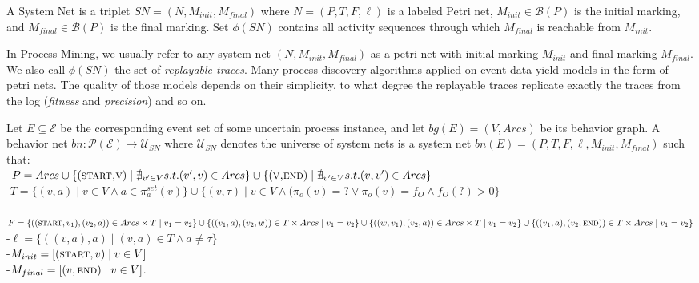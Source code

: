 \begin{definition}
A System Net is a triplet $SN=(N,M_{init},M_{final})$ where $N=(P,T,F,\ell)$ is a labeled Petri net, $M_{init} \in \mathcal{B}(P)$ is the initial marking, and $M_{final} \in \mathcal{B}(P)$ is the final marking.
Set $\phi(SN)$ contains all activity sequences through which $M_{final}$  is reachable from $M_{init}$.
\end{definition}

In Process Mining, we usually refer to any system net $(N,M_{init},M_{final})$ as a petri net with initial marking $M_{init}$ and final marking $M_{final}$.
We also call $\phi(SN)$ the set of \textit{replayable traces}.
Many process discovery algorithms applied on event data yield models in the form of petri nets.
The quality of those models depends on their simplicity, to what degree the replayable traces replicate exactly the traces from the log (\textit{fitness} and \textit{precision}) and so on.

\begin{definition} \label{def: bn}
Let $E \subseteq \mathcal{E}$ be the corresponding event set of some uncertain process instance, and let $bg(E)=(V,Arcs)$ be its behavior graph.
A behavior net $bn: \mathcal{P}(\mathcal{E}) \to \mathcal{U}_{SN}$ where $\mathcal{U}_{SN}$ denotes the universe of system nets is a system net $bn(E)=(P,T,F,\ell,M_{init},M_{final})$ such that:\\
-$P= Arcs \cup \\ 
\{(\textsc{start,v}) \mid \nexists_{v'\in V} s.t. (v',v) \in Arcs\} \cup  \\
\{(\textsc{v,\textsc{end}}) \mid \nexists_{v'\in V} s.t. (v,v') \in Arcs\}$\\
-$T=\{(v,a) \mid v \in V \wedge a \in \pi_a^{set}(v)\} \cup 
\{(v,\tau) \mid v \in V \wedge (\pi_o(v) = ? \vee \pi_o(v)=f_O \wedge f_O(?)>0 \}$\\
-$F= \{((\textsc{start},v_1),(v_2,a)) \in Arcs \times T \mid v_1 = v_2\} \cup \\
\{((v_1,a),(v_2,w)) \in T \times Arcs \mid v_1=v_2\} \cup \\
\{((w,v_1),(v_2,a)) \in Arcs \times T \mid v_1=v_2\} \cup \\
\{((v_1,a),(v_2,\textsc{end})) \in T \times Arcs \mid v_1 = v_2\} $\\
-$\ell=\{((v,a),a) \mid (v,a) \in T \wedge a \neq \tau\}$\\
-$M_{init} = [(\textsc{start},v) \mid v \in V]$\\
-$M_{final} = [(v,\textsc{end}) \mid v \in V]$.
\end{definition}


